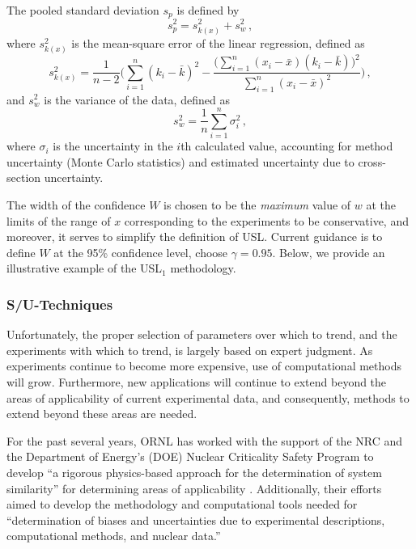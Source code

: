 The pooled standard deviation $s_p$ is defined by
\begin{equation}
 s^2_p = s^2_{k(x)} + s^2_w \, ,
\end{equation}
where $s^2_{k(x)}$ is the mean-square error of the linear regression, 
defined as
\begin{equation}
 s^2_{k(x)} = \frac{1}{n-2} \Bigg ( \sum^n_{i=1} (k_i - \bar{k})^2 - 
              \frac{\Big(\sum^n_{i=1} (x_i-\bar{x})(k_i -\bar{k}) \Big )^2 }
                   {\sum^n_{i=1} (x_i - \bar{x})^2} \Bigg ) \, ,
\end{equation}
and $s^2_w$ is the variance of the data, defined as
\begin{equation}
 s^2_w = \frac{1}{n} \sum^n_{i=1} \sigma^2_i \, ,
\end{equation}
where  $\sigma_i$ is the uncertainty in the $i$th calculated value, 
accounting for method uncertainty (\eg Monte Carlo statistics) and 
estimated uncertainty due to cross-section uncertainty.

The width of the confidence $W$ is chosen to be the \textit{ maximum} value 
of $w$ at the limits of the range of $x$ corresponding to the experiments 
to be conservative, and moreover, it serves to simplify the definition of 
USL.  Current guidance is to define $W$ at the 95\% confidence level, 
\ie choose $\gamma = 0.95$.  Below, we provide an
illustrative example of the USL$_1$ methodology.


\subsubsection{S/U-Techniques}

Unfortunately, the proper selection of parameters over which to trend, 
and the experiments with which to trend, is largely based on expert 
judgment.  As experiments continue to become more expensive, use of 
computational methods will grow.  Furthermore, new applications will 
continue to extend beyond the areas of applicability of current 
experimental data, and consequently, methods to extend beyond these 
areas are needed.

For the past several years, ORNL has worked with the support of the 
NRC and the Department of Energy's (DOE) Nuclear Criticality Safety 
Program to develop ``a rigorous physics-based approach for the 
determination of system similarity'' for determining areas of 
applicability \cite{broadhead2004sau}.  Additionally, their efforts 
aimed to develop the methodology and computational tools needed for 
``determination of biases and uncertainties due to experimental 
descriptions, computational methods, and nuclear data.''

